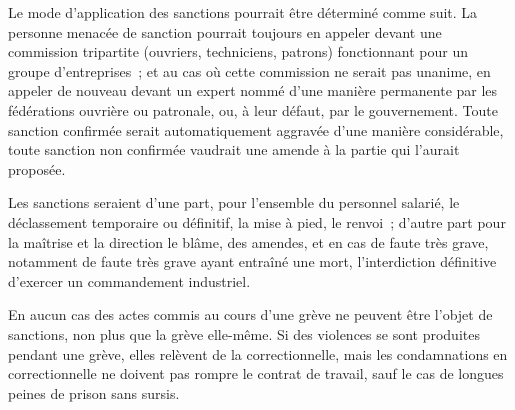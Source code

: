 \documentclass[french,twoside]{book} %
\begin{document}
Le mode d'application des sanctions pourrait être déterminé comme suit. La personne menacée de sanction pourrait toujours en appeler devant une commission tripartite (ouvriers, techniciens, patrons) fonctionnant pour un groupe d'entreprises ; et au cas où cette commission ne serait pas unanime, en appeler de nouveau devant un expert nommé d'une manière permanente par les fédérations ouvrière ou patronale, ou, à leur défaut, par le gouvernement. Toute sanction confirmée serait automatiquement aggravée d'une manière considérable, toute sanction non confirmée vaudrait une amende à la partie qui l'aurait proposée.\par
Les sanctions seraient d'une part, pour l'ensemble du personnel salarié, le déclassement temporaire ou définitif, la mise à pied, le renvoi ; d'autre part pour la maîtrise et la direction le blâme, des amendes, et en cas de faute très grave, notamment de faute très grave ayant entraîné une mort, l'interdiction définitive d'exercer un commandement industriel.\par
En aucun cas des actes commis au cours d'une grève ne peuvent être l'objet de sanctions, non plus que la grève elle-même. Si des violences se sont produites pendant une grève, elles relèvent de la correctionnelle, mais les condamnations en correctionnelle ne doivent pas rompre le contrat de travail, sauf le cas de longues peines de prison sans sursis.
\end{document}
